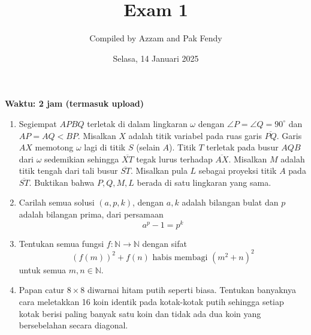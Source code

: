 \documentclass[11pt]{scrartcl}
\title{Exam 1}
\author{Compiled by Azzam and Pak Fendy}
\date{Selasa, 14 Januari 2025}
\begin{document}
\maketitle
\textbf{Waktu: 2 jam (termasuk upload)}

\begin{enumerate}

\item Segiempat \( APBQ \) terletak di dalam lingkaran \( \omega \) dengan \( \angle P = \angle Q = 90^{\circ} \) dan \( AP = AQ < BP \). Misalkan \( X \) adalah titik variabel pada ruas garis \( \overline{PQ} \). Garis \( AX \) memotong \( \omega \) lagi di titik \( S \) (selain \( A \)). Titik \( T \) terletak pada busur \( AQB \) dari \( \omega \) sedemikian sehingga \( \overline{XT} \) tegak lurus terhadap \( \overline{AX} \). Misalkan \( M \) adalah titik tengah dari tali busur \( \overline{ST} \). Misalkan pula \( L \) sebagai proyeksi titik \(A\) pada \(\overline{ST}\). Buktikan bahwa \( P, Q, M, L\) berada di satu lingkaran yang sama.

\item Carilah semua solusi $(a,p,k)$, dengan $a,k$ adalah bilangan bulat dan $p$ adalah bilangan prima, dari persamaan $$a^p-1=p^k$$

\item Tentukan semua fungsi \( f: \mathbb{N} \to \mathbb{N} \) dengan sifat
   \[
   (f(m))^2 + f(n) \text{ habis membagi } (m^2 + n)^2
   \]
   untuk semua \( m, n \in \mathbb{N} \).

\item Papan catur \( 8 \times 8 \) diwarnai hitam putih seperti biasa. Tentukan banyaknya cara meletakkan 16 koin identik pada kotak-kotak putih sehingga setiap kotak berisi paling banyak satu koin dan tidak ada dua koin yang bersebelahan secara diagonal.

\end{enumerate}
\end{document}
